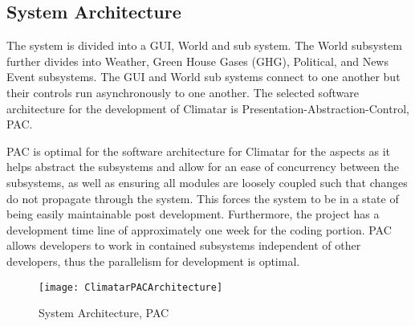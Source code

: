 \documentclass[]{article}
\begin{document}
\subsection{System Architecture}
\label{sub:system_architecture}
The system is divided into a GUI, World and sub system. The World subsystem further divides into Weather, Green House Gases (GHG), Political, and News Event subsystems. The GUI and World sub systems connect to one another but their controls run asynchronously to one another. The selected software architecture for the development of Climatar is Presentation-Abstraction-Control, PAC. 

PAC is optimal for the software architecture for Climatar for the aspects as it helps abstract the subsystems and allow for an ease of concurrency between the subsystems, as well as ensuring all modules are loosely coupled such that changes do not propagate through the system. This forces the system to be in a state of being easily maintainable post development. Furthermore, the project has a development time line of approximately one week for the coding portion. PAC allows developers to work in contained subsystems independent of other developers, thus the parallelism for development is optimal.

\begin{figure}[ht!]
\centering
\texttt{[image: ClimatarPACArchitecture]}
\caption{System Architecture, PAC\label{pacarch}}
\end{figure}

\end{document}
